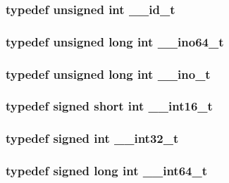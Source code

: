 \subsubsection[{\_\-\_\-id\_\-t}]{\setlength{\rightskip}{0pt plus 5cm}typedef unsigned int {\bf \_\-\_\-id\_\-t}}\label{tp_8c_a4d47b406471830dbfdf9133502ab1e2d}
\subsubsection[{\_\-\_\-ino64\_\-t}]{\setlength{\rightskip}{0pt plus 5cm}typedef unsigned long int {\bf \_\-\_\-ino64\_\-t}}\label{tp_8c_abfb194e8746c9569d7bff6b8e3581ffb}
\subsubsection[{\_\-\_\-ino\_\-t}]{\setlength{\rightskip}{0pt plus 5cm}typedef unsigned long int {\bf \_\-\_\-ino\_\-t}}\label{tp_8c_a0d5670467b75318af25cf289013233be}
\subsubsection[{\_\-\_\-int16\_\-t}]{\setlength{\rightskip}{0pt plus 5cm}typedef signed short int {\bf \_\-\_\-int16\_\-t}}\label{tp_8c_a91332b87f3597b3ecb7ad353bcda944c}
\subsubsection[{\_\-\_\-int32\_\-t}]{\setlength{\rightskip}{0pt plus 5cm}typedef signed int {\bf \_\-\_\-int32\_\-t}}\label{tp_8c_ad81dd3c6092f614cc96a1bb25914e653}
\subsubsection[{\_\-\_\-int64\_\-t}]{\setlength{\rightskip}{0pt plus 5cm}typedef signed long int {\bf \_\-\_\-int64\_\-t}}\label{tp_8c_aeb10a021f8f3b5aaae942fe6b104abb2}
